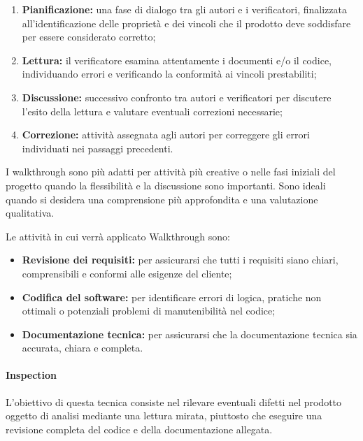 \begin{enumerate}
    \item \textbf{Pianificazione:} 
        una fase di dialogo tra gli autori e i verificatori, finalizzata all'identificazione delle proprietà e dei vincoli che il prodotto deve soddisfare per essere considerato corretto;

    \item \textbf{Lettura:} 
        il verificatore esamina attentamente i documenti e/o il codice, individuando errori e verificando la conformità ai vincoli prestabiliti;

    \item \textbf{Discussione:} 
        successivo confronto tra autori e verificatori per discutere l'esito della lettura e valutare eventuali correzioni necessarie;

    \item \textbf{Correzione:} 
        attività assegnata agli autori per correggere gli errori individuati nei passaggi precedenti.
\end{enumerate}

I walkthrough sono più adatti per attività più creative o nelle fasi iniziali del progetto quando la flessibilità e la discussione sono importanti. Sono ideali quando si desidera una comprensione più approfondita e una valutazione qualitativa.

Le attività in cui verrà applicato Walkthrough sono:
\begin{itemize}
    \item \textbf{Revisione dei requisiti:} 
        per assicurarsi che tutti i requisiti siano chiari, comprensibili e conformi alle esigenze del cliente;
    \item \textbf{Codifica del software:} 
        per identificare errori di logica, pratiche non ottimali o potenziali problemi di manutenibilità nel codice;
    \item \textbf{Documentazione tecnica:} 
        per assicurarsi che la documentazione tecnica sia accurata, chiara e completa.
\end{itemize}

\paragraph{Inspection}
L'obiettivo di questa tecnica consiste nel rilevare eventuali difetti nel prodotto oggetto di analisi mediante una lettura mirata, piuttosto che eseguire una revisione completa del codice e della documentazione allegata.

